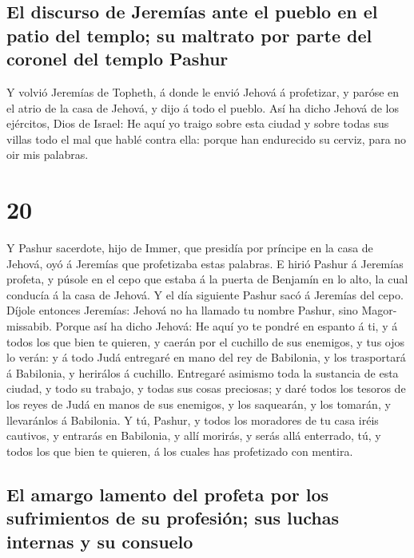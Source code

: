 \hypertarget{el-discurso-de-jeremuxedas-ante-el-pueblo-en-el-patio-del-templo-su-maltrato-por-parte-del-coronel-del-templo-pashur}{%
\subsection{El discurso de Jeremías ante el pueblo en el patio del
templo; su maltrato por parte del coronel del templo
Pashur}\label{el-discurso-de-jeremuxedas-ante-el-pueblo-en-el-patio-del-templo-su-maltrato-por-parte-del-coronel-del-templo-pashur}}

 Y volvió Jeremías de Topheth, á donde le envió Jehová á
profetizar, y paróse en el atrio de la casa de Jehová, y dijo á todo el
pueblo.  Así ha dicho Jehová de los ejércitos, Dios de
Israel: He aquí yo traigo sobre esta ciudad y sobre todas sus villas
todo el mal que hablé contra ella: porque han endurecido su cerviz, para
no oir mis palabras.

\hypertarget{section-19}{%
\section{20}\label{section-19}}

 Y Pashur sacerdote, hijo de Immer, que presidía por
príncipe en la casa de Jehová, oyó á Jeremías que profetizaba estas
palabras.  E hirió Pashur á Jeremías profeta, y púsole en
el cepo que estaba á la puerta de Benjamín en lo alto, la cual conducía
á la casa de Jehová.  Y el día siguiente Pashur sacó á
Jeremías del cepo. Díjole entonces Jeremías: Jehová no ha llamado tu
nombre Pashur, sino Magor-missabib.  Porque así ha dicho
Jehová: He aquí yo te pondré en espanto á ti, y á todos los que bien te
quieren, y caerán por el cuchillo de sus enemigos, y tus ojos lo verán:
y á todo Judá entregaré en mano del rey de Babilonia, y los trasportará
á Babilonia, y herirálos á cuchillo.  Entregaré asimismo
toda la sustancia de esta ciudad, y todo su trabajo, y todas sus cosas
preciosas; y daré todos los tesoros de los reyes de Judá en manos de sus
enemigos, y los saquearán, y los tomarán, y llevaránlos á Babilonia.
 Y tú, Pashur, y todos los moradores de tu casa iréis
cautivos, y entrarás en Babilonia, y allí morirás, y serás allá
enterrado, tú, y todos los que bien te quieren, á los cuales has
profetizado con mentira.

\hypertarget{el-amargo-lamento-del-profeta-por-los-sufrimientos-de-su-profesiuxf3n-sus-luchas-internas-y-su-consuelo}{%
\subsection{El amargo lamento del profeta por los sufrimientos de su
profesión; sus luchas internas y su
consuelo}\label{el-amargo-lamento-del-profeta-por-los-sufrimientos-de-su-profesiuxf3n-sus-luchas-internas-y-su-consuelo}}

